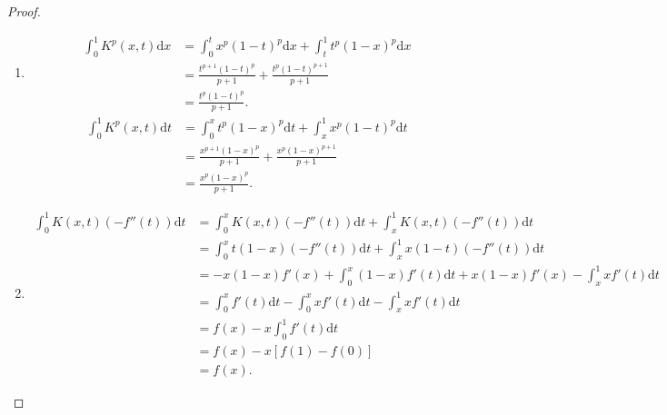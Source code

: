 \documentclass[../../main.tex]{subfiles}
\begin{document}
\begin{proof}
\begin{enumerate}[(1)]
\item \begin{align*}
\int_0^1{K^p\left( x,t \right) \mathrm{d}x}&=\int_0^t{x^p\left( 1-t \right) ^p\mathrm{d}x}+\int_t^1{t^p\left( 1-x \right) ^p\mathrm{d}x}
\\
&=\frac{t^{p+1}\left( 1-t \right) ^p}{p+1}+\frac{t^p\left( 1-t \right) ^{p+1}}{p+1}
\\
&=\frac{t^p\left( 1-t \right) ^p}{p+1}.
\end{align*}
\begin{align*}
\int_0^1{K^p\left( x,t \right) \mathrm{d}t}&=\int_0^x{t^p\left( 1-x \right) ^p\mathrm{d}t}+\int_x^1{x^p\left( 1-t \right) ^p\mathrm{d}t}
\\
&=\frac{x^{p+1}\left( 1-x \right) ^p}{p+1}+\frac{x^p\left( 1-x \right) ^{p+1}}{p+1}
\\
&=\frac{x^p\left( 1-x \right) ^p}{p+1}.
\end{align*}

\item \begin{align*}
\int_0^1{K\left( x,t \right) \left( -f'' \left( t \right) \right) \mathrm{d}t}&=\int_0^x{K\left( x,t \right) \left( -f'' \left( t \right) \right) \mathrm{d}t}+\int_x^1{K\left( x,t \right) \left( -f'' \left( t \right) \right) \mathrm{d}t}
\\
&=\int_0^x{t\left( 1-x \right) \left( -f'' \left( t \right) \right) \mathrm{d}t}+\int_x^1{x\left( 1-t \right) \left( -f'' \left( t \right) \right) \mathrm{d}t}
\\
&=-x\left( 1-x \right) f' \left( x \right) +\int_0^x{\left( 1-x \right) f' \left( t \right) \mathrm{d}t}+x\left( 1-x \right) f' \left( x \right) -\int_x^1{xf' \left( t \right) \mathrm{d}t}
\\
&=\int_0^x{f' \left( t \right) \mathrm{d}t}-\int_0^x{xf' \left( t \right) \mathrm{d}t}-\int_x^1{xf' \left( t \right) \mathrm{d}t}
\\
&=f\left( x \right) -x\int_0^1{f' \left( t \right) \mathrm{d}t}
\\
&=f\left( x \right) -x\left[ f\left( 1 \right) -f\left( 0 \right) \right] 
\\
&=f\left( x \right) .
\end{align*}
\end{enumerate}
\end{proof}
\end{document}

